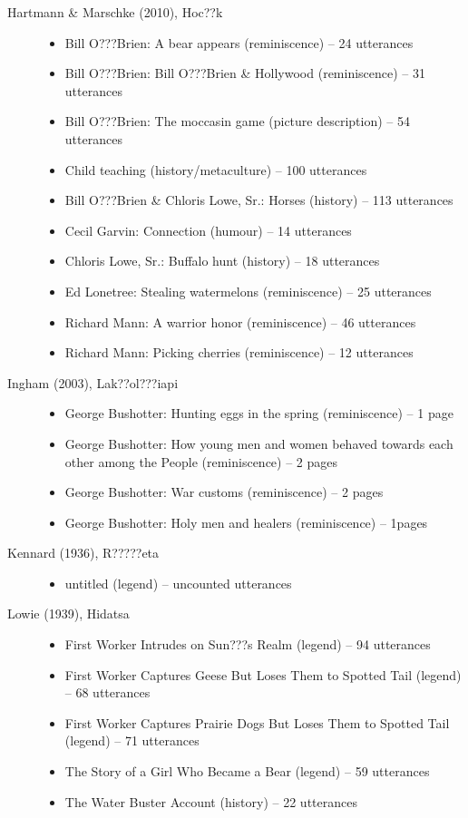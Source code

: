 \documentclass[output=paper]{LSP/langsci}
\begin{document}
\begin{description}
\item[Hartmann \& Marschke (2010), Hoc??k]\hfill
\begin{itemize}
\item Bill O???Brien: A bear appears (reminiscence) -- 24 utterances
\item Bill O???Brien: Bill O???Brien \& Hollywood (reminiscence) -- 31 utterances
\item Bill O???Brien: The moccasin game (picture description) -- 54 utterances
\item Child teaching (history/metaculture) -- 100 utterances
\item Bill O???Brien \& Chloris Lowe, Sr.: Horses (history) -- 113 utterances
\item Cecil Garvin: Connection (humour) -- 14 utterances
\item Chloris Lowe, Sr.: Buffalo hunt (history) -- 18 utterances
\item Ed Lonetree: Stealing watermelons (reminiscence) -- 25 utterances
\item Richard Mann: A warrior honor (reminiscence) -- 46 utterances
\item Richard Mann: Picking cherries (reminiscence) -- 12 utterances
\end{itemize}

\item[Ingham (2003), Lak??ol???iapi]\hfill
\begin{itemize}
\item George Bushotter: Hunting eggs in the spring (reminiscence) -- 1 page
\item George Bushotter: How young men and women behaved towards each other among the People (reminiscence) -- 2 pages
\item George Bushotter: War customs (reminiscence) -- 2 pages
\item George Bushotter: Holy men and healers (reminiscence) -- 1\textonehalf{}pages
\end{itemize}

\item[Kennard (1936), R?????eta]\hfill
\begin{itemize}
\item untitled (legend) -- uncounted utterances
\end{itemize}

\item[Lowie (1939), Hidatsa]\hfill
\begin{itemize}
\item First Worker Intrudes on Sun???s Realm (legend) -- 94 utterances
\item First Worker Captures Geese But Loses Them to Spotted Tail (legend) -- 68 utterances
\item First Worker Captures Prairie Dogs But Loses Them to Spotted Tail (legend) -- 71 utterances
\item The Story of a Girl Who Became a Bear (legend) -- 59 utterances
\item The Water Buster Account (history) -- 22 utterances
\end{itemize}


\end{description}
\end{document}
